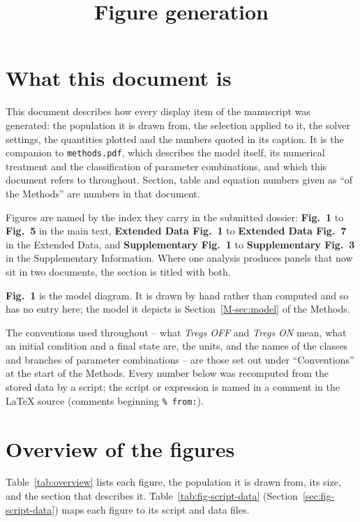 \documentclass[11pt]{article}
\title{Figure generation}
\author{}
\date{}
\begin{document}
\maketitle
\tableofcontents


\section*{What this document is}

This document describes how every display item of the manuscript was generated:
the population it is drawn from, the selection applied to it, the solver settings,
the quantities plotted and the numbers quoted in its caption. It is the companion
to \texttt{methods.pdf}, which describes the model itself, its numerical treatment
and the classification of parameter combinations, and which this document refers
to throughout. Section, table and equation numbers given as ``of the Methods''
are numbers in that document.

Figures are named by the index they carry in the submitted dossier: \textbf{Fig.~1}
to \textbf{Fig.~5} in the main text, \textbf{Extended Data Fig.~1} to
\textbf{Extended Data Fig.~7} in the Extended Data, and
\textbf{Supplementary Fig.~1} to \textbf{Supplementary Fig.~3} in the
Supplementary Information. Where one analysis produces panels that now sit in two
documents, the section is titled with both.

\textbf{Fig.~1} is the model diagram. It is drawn by hand rather than computed and
so has no entry here; the model it depicts is Section~\ref{M-sec:model} of the Methods.

The conventions used throughout -- what \emph{Tregs OFF} and \emph{Tregs ON} mean,
what an initial condition and a final state are, the units, and the names of the
classes and branches of parameter combinations -- are those set out under
``Conventions'' at the start of the Methods. Every number below was recomputed from
the stored data by a script; the script or expression is named in a comment in the
LaTeX source (comments beginning \texttt{\% from:}).

\section{Overview of the figures}

Table~\ref{tab:overview} lists each figure, the population it is drawn from, its
size, and the section that describes it. Table~\ref{tab:fig-script-data}
(Section~\ref{sec:fig-script-data}) maps each figure to its script and data files.
\end{document}
